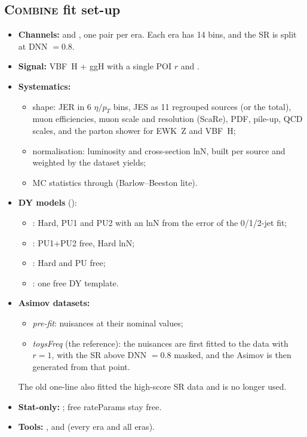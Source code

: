 \documentclass[11pt,a4paper]{article}
\begin{document}
\subsection{\textsc{Combine} fit set-up}
\begin{itemize}
  \item \textbf{Channels:}  and , one
  pair per era. Each era has 14 bins, and the SR is split at DNN $=0.8$.
  \item \textbf{Signal:} VBF~H + ggH with a single POI $r$ and
  .
  \item \textbf{Systematics:}
  \begin{itemize}
    \item shape: JER in 6 $\eta/p_T$ bins, JES as 11 regrouped sources (or
    the total), muon efficiencies, muon scale and resolution (ScaRe), PDF,
    pile-up, QCD scales, and the parton shower for EWK~Z and VBF~H;
    \item normalisation: luminosity and cross-section lnN, built per source
    and weighted by the dataset yields;
    \item MC statistics through  (Barlow--Beeston lite).
  \end{itemize}
  \item \textbf{DY models} ():
  \begin{itemize}
    \item {}: Hard, PU1 and PU2 with an lnN from the error of the
    0/1/2-jet fit;
    \item {}: PU1+PU2 free, Hard lnN;
    \item {}: Hard and PU free;
    \item {}: one free DY template.
  \end{itemize}
  \item \textbf{Asimov datasets:}
  \begin{itemize}
    \item \emph{pre-fit}: nuisances at their nominal values;
    \item \emph{toysFreq} (the reference): the nuisances are first fitted to
    the data with $r = 1$, with the SR above DNN $=0.8$ masked, and the Asimov is
    then generated from that point.
  \end{itemize}
  The old one-line  also fitted the high-score SR data and is
  no longer used.
  \item \textbf{Stat-only:} ;
  free rateParams stay free.
  \item \textbf{Tools:} ,
   and  (every era and
  all eras).
\end{itemize}
\end{document}
